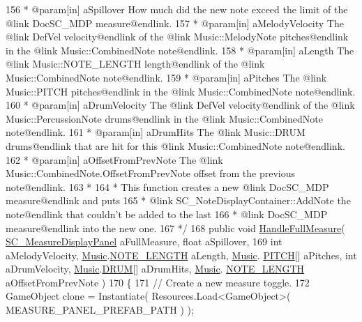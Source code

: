 \begin{DoxyCodeInclude}
156 \textcolor{comment}{     * @param[in] aSpillover How much did the new note exceed the limit of the @link DocSC\_MDP
       measure@endlink.}
157 \textcolor{comment}{     * @param[in] aMelodyVelocity The @link DefVel velocity@endlink of the @link Music::MelodyNote
       pitches@endlink in the @link Music::CombinedNote note@endlink.}
158 \textcolor{comment}{     * @param[in] aLength The @link Music::NOTE\_LENGTH length@endlink of the @link Music::CombinedNote
       note@endlink.}
159 \textcolor{comment}{     * @param[in] aPitches The @link Music::PITCH pitches@endlink in the @link Music::CombinedNote
       note@endlink.}
160 \textcolor{comment}{     * @param[in] aDrumVelocity The @link DefVel velocity@endlink of the @link Music::PercussionNote
       drums@endlink in the @link Music::CombinedNote note@endlink.}
161 \textcolor{comment}{     * @param[in] aDrumHits The @link Music::DRUM drums@endlink that are hit for this @link
       Music::CombinedNote note@endlink.}
162 \textcolor{comment}{     * @param[in] aOffsetFromPrevNote The @link Music::CombinedNote.OffsetFromPrevNote offset from the
       previous note@endlink.}
163 \textcolor{comment}{     * }
164 \textcolor{comment}{     * This function creates a new @link DocSC\_MDP measure@endlink and puts }
165 \textcolor{comment}{     * @link SC\_NoteDisplayContainer::AddNote the note@endlink that couldn't be added to the last}
166 \textcolor{comment}{     * @link DocSC\_MDP measure@endlink into the new one.}
167 \textcolor{comment}{    */}
168     \textcolor{keyword}{public} \textcolor{keywordtype}{void} \hyperlink{group___s_c___n_d_c_handlers_ga40c5a3b59608c559ab96ad0338c5e042}{HandleFullMeasure}( \hyperlink{class_s_c___measure_display_panel}{SC\_MeasureDisplayPanel} 
      aFullMeasure, \textcolor{keywordtype}{float} aSpillover,
169         \textcolor{keywordtype}{int} aMelodyVelocity, \hyperlink{class_music}{Music}.\hyperlink{group___music_enums_gaf11b5f079adbb21c800b9eca1c5c3cbd}{NOTE\_LENGTH} aLength, \hyperlink{class_music}{Music}.
      \hyperlink{group___music_enums_ga508f69b199ea518f935486c990edac1d}{PITCH}[] aPitches, \textcolor{keywordtype}{int} aDrumVelocity, \hyperlink{class_music}{Music}.\hyperlink{group___music_enums_gade475b4382c7066d1af13e7c13c029b6}{DRUM}[] aDrumHits, \hyperlink{class_music}{Music}.
      \hyperlink{group___music_enums_gaf11b5f079adbb21c800b9eca1c5c3cbd}{NOTE\_LENGTH} aOffsetFromPrevNote )
170     \{
171         \textcolor{comment}{// Create a new measure toggle.}
172         GameObject clone = Instantiate( Resources.Load<GameObject>( MEASURE\_PANEL\_PREFAB\_PATH ) );

\end{DoxyCodeInclude}
